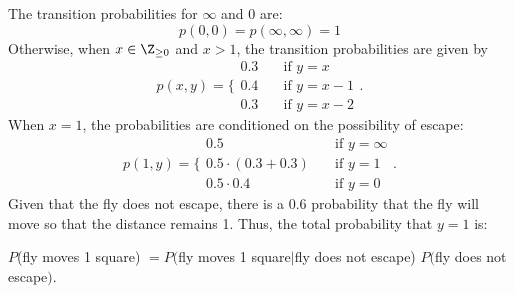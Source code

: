 \documentclass{homework}
\begin{document}
The transition probabilities for $\infty$ and 0 are:
\begin{equation*}
    p(0, 0) = p(\infty, \infty) = 1
\end{equation*}
Otherwise, when $x\in \Z_{\geq 0}$ and $x > 1$, the transition probabilities
are given by
\begin{equation*}
    p(x, y) = \biggl\{
        \begin{array}{ll}
            0.3 &\quad \text{if }y = x \\
            0.4 &\quad \text{if }y = x - 1 \\
            0.3 &\quad \text{if }y = x - 2
        \end{array}
    \biggr.
\end{equation*}
When $x=1$, the probabilities are conditioned on the possibility of escape:
\begin{equation*}
    p(1, y) = \biggl\{
        \begin{array}{ll}
            0.5 &\quad \text{if }y = \infty \\
            0.5 \cdot (0.3 + 0.3) &\quad \text{if }y = 1 \\
            0.5 \cdot 0.4 &\quad \text{if }y = 0
        \end{array}
    \biggr.
\end{equation*}
Given that the fly does not escape, there is a 0.6 probability that the fly will
move so that the distance remains 1. Thus, the total probability that $y=1$
is:

$P$(fly moves 1 square) $= P($fly moves 1 square$|$fly does not escape) $P($fly does not escape$)$.
\end{document}
